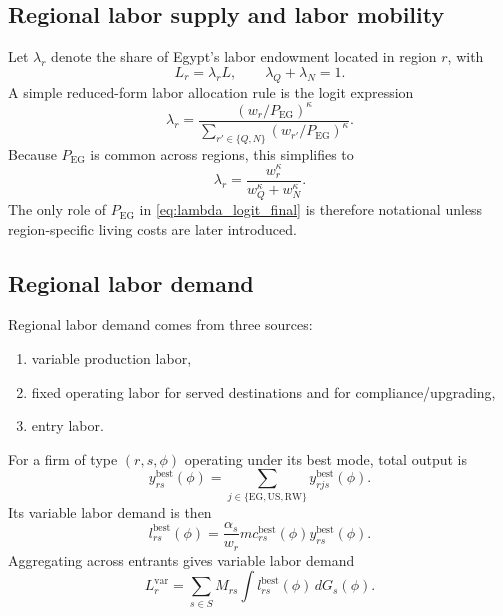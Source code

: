 \documentclass[11pt]{article}
\begin{document}
\subsection{Regional labor supply and labor mobility}

Let \(\lambda_r\) denote the share of Egypt's labor endowment located in region \(r\), with
\begin{equation}
L_r=\lambda_r L, \qquad \lambda_Q+\lambda_N=1.
\end{equation}
A simple reduced-form labor allocation rule is the logit expression
\begin{equation}
\lambda_r = \frac{(w_r/P_{\mathrm{EG}})^\kappa}{\sum_{r'\in\{Q,N\}}(w_{r'}/P_{\mathrm{EG}})^\kappa}.
\label{eq:lambda_logit_final}
\end{equation}
Because \(P_{\mathrm{EG}}\) is common across regions, this simplifies to
\begin{equation}
\lambda_r = \frac{w_r^\kappa}{w_Q^\kappa+w_N^\kappa}.
\end{equation}
The only role of \(P_{\mathrm{EG}}\) in \eqref{eq:lambda_logit_final} is therefore notational unless region-specific living costs are later introduced.

\subsection{Regional labor demand}

Regional labor demand comes from three sources:
\begin{enumerate}[leftmargin=*]
    \item variable production labor,
    \item fixed operating labor for served destinations and for compliance/upgrading,
    \item entry labor.
\end{enumerate}

For a firm of type \((r,s,\phi)\) operating under its best mode, total output is
\begin{equation}
y^{\mathrm{best}}_{rs}(\phi)=\sum_{j\in\{\mathrm{EG},\mathrm{US},\mathrm{RW}\}} y^{\mathrm{best}}_{rjs}(\phi).
\end{equation}
Its variable labor demand is then
\begin{equation}
l^{\mathrm{best}}_{rs}(\phi)=\frac{\alpha_s}{w_r}mc^{\mathrm{best}}_{rs}(\phi)y^{\mathrm{best}}_{rs}(\phi).
\end{equation}
Aggregating across entrants gives variable labor demand
\begin{equation}
L_r^{\mathrm{var}}=\sum_{s\in S}M_{rs}\int l^{\mathrm{best}}_{rs}(\phi)\,dG_s(\phi).
\end{equation}
\end{document}
